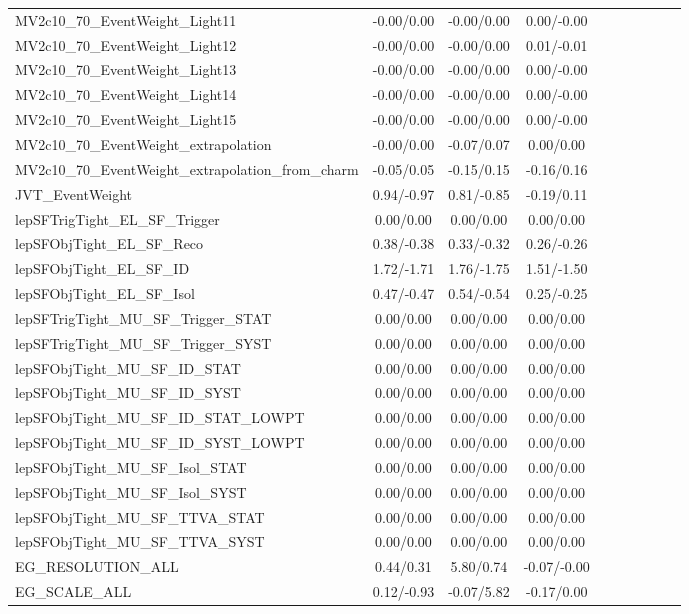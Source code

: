 \begin{table}[h]
\begin{center}
\begin{tabular}{l|ccccccccc}
MV2c10\_70\_EventWeight\_Light11 &-0.00/0.00 &-0.00/0.00 &0.00/-0.00 \\
MV2c10\_70\_EventWeight\_Light12 &-0.00/0.00 &-0.00/0.00 &0.01/-0.01 \\
MV2c10\_70\_EventWeight\_Light13 &-0.00/0.00 &-0.00/0.00 &0.00/-0.00 \\
MV2c10\_70\_EventWeight\_Light14 &-0.00/0.00 &-0.00/0.00 &0.00/-0.00 \\
MV2c10\_70\_EventWeight\_Light15 &-0.00/0.00 &-0.00/0.00 &0.00/-0.00 \\
MV2c10\_70\_EventWeight\_extrapolation &-0.00/0.00 &-0.07/0.07 &0.00/0.00 \\
MV2c10\_70\_EventWeight\_extrapolation\_from\_charm &-0.05/0.05 &-0.15/0.15 &-0.16/0.16 \\
JVT\_EventWeight &0.94/-0.97 &0.81/-0.85 &-0.19/0.11 \\
lepSFTrigTight\_EL\_SF\_Trigger &0.00/0.00 &0.00/0.00 &0.00/0.00 \\
lepSFObjTight\_EL\_SF\_Reco &0.38/-0.38 &0.33/-0.32 &0.26/-0.26 \\
lepSFObjTight\_EL\_SF\_ID &1.72/-1.71 &1.76/-1.75 &1.51/-1.50 \\
lepSFObjTight\_EL\_SF\_Isol &0.47/-0.47 &0.54/-0.54 &0.25/-0.25 \\
lepSFTrigTight\_MU\_SF\_Trigger\_STAT &0.00/0.00 &0.00/0.00 &0.00/0.00 \\
lepSFTrigTight\_MU\_SF\_Trigger\_SYST &0.00/0.00 &0.00/0.00 &0.00/0.00 \\
lepSFObjTight\_MU\_SF\_ID\_STAT &0.00/0.00 &0.00/0.00 &0.00/0.00 \\
lepSFObjTight\_MU\_SF\_ID\_SYST &0.00/0.00 &0.00/0.00 &0.00/0.00 \\
lepSFObjTight\_MU\_SF\_ID\_STAT\_LOWPT &0.00/0.00 &0.00/0.00 &0.00/0.00 \\
lepSFObjTight\_MU\_SF\_ID\_SYST\_LOWPT &0.00/0.00 &0.00/0.00 &0.00/0.00 \\
lepSFObjTight\_MU\_SF\_Isol\_STAT &0.00/0.00 &0.00/0.00 &0.00/0.00 \\
lepSFObjTight\_MU\_SF\_Isol\_SYST &0.00/0.00 &0.00/0.00 &0.00/0.00 \\
lepSFObjTight\_MU\_SF\_TTVA\_STAT &0.00/0.00 &0.00/0.00 &0.00/0.00 \\
lepSFObjTight\_MU\_SF\_TTVA\_SYST &0.00/0.00 &0.00/0.00 &0.00/0.00 \\
EG\_RESOLUTION\_ALL &0.44/0.31 &5.80/0.74 &-0.07/-0.00 \\
EG\_SCALE\_ALL &0.12/-0.93 &-0.07/5.82 &-0.17/0.00 \\

\end{tabular}
\end{center}
\end{table}
